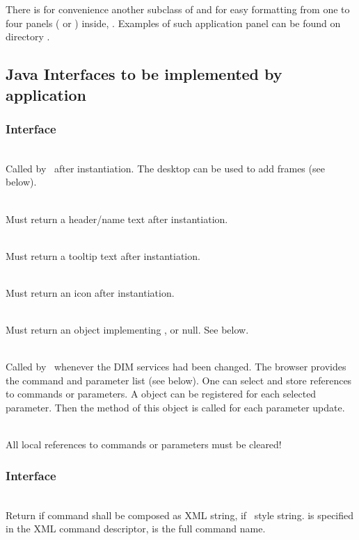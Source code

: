 There is for convenience another subclass of  and  for easy formatting from one to four panels 
( or ) inside,
.
Examples of such application panel can be found on directory .
\subsection{Java Interfaces to be implemented by application}
\subsubsection{Interface }
\bcir
\item {}\\
Called by \gui\ after instantiation. The desktop can be used to add frames (see below).
\item {}\\
Must return a header/name text after instantiation.
\item {}\\
Must return a tooltip text after instantiation.
\item {}\\
Must return an icon after instantiation.
\item {}\\
Must return an object implementing , or null. See below.
\item {}\\
Called by \gui\ whenever the DIM services had been changed.
The browser provides the command and parameter list (see below). 
One can select and store references to commands or parameters. 
A  object can be registered for each selected parameter. 
Then the  method of this object is called for each parameter update.
\item {}\\
All local references to commands or parameters must be cleared!
\ecir
\subsubsection{Interface }
\bcir
\item {}\\
Return  if command shall be composed as XML string, 
 if \mbs\ style string.  
is specified in the XML command descriptor,  is the full command name.
\ecir
